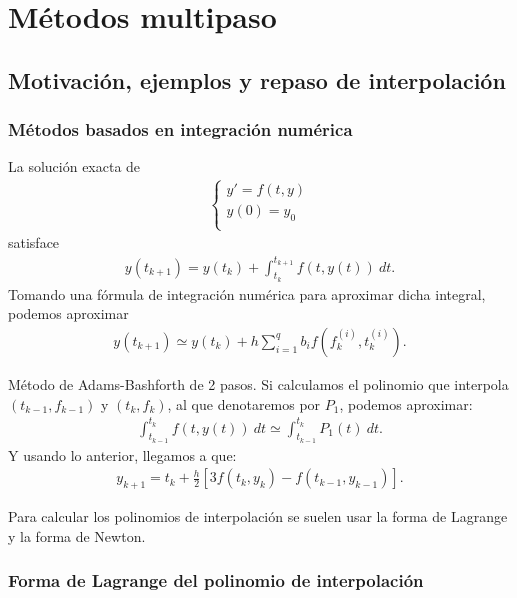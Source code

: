 \chapter{Métodos multipaso}

\section{Motivación, ejemplos y repaso de interpolación}

\subsection{Métodos basados en integración numérica}

La solución exacta de
\begin{align*}
    \left\{ \begin{array}{lcc}
                y' = f(t,y) \\
                y(0) = y_0  \\
            \end{array}
    \right.
\end{align*}
satisface
\begin{align*}
    y(t_{k+1}) = y(t_k) + \int_{t_k}^{t_{k+1}} f(t,y(t)) \ dt.
\end{align*}
Tomando una fórmula de integración numérica para aproximar dicha integral, podemos aproximar
\begin{align*}
    y(t_{k+1}) \simeq y(t_k) +h\sum_{i=1}^{q} b_if\left( f_k^{(i)}, t_k^{(i)} \right).
\end{align*}

\begin{ejemplo}
    Método de Adams-Bashforth de 2 pasos. Si calculamos el polinomio que interpola $(t_{k-1},f_{k-1})$ y $(t_k,f_k)$, al que denotaremos por $P_1$, podemos aproximar:
    \begin{align*}
        \int_{t_{k-1}}^{t_k} f(t,y(t)) \ dt \simeq  \int_{t_{k-1}}^{t_k} P_1(t) \ dt.
    \end{align*}
    Y usando lo anterior, llegamos a que:
    \begin{align*}
        y_{k+1} = t_k + \frac{h}{2}[3f(t_k,y_k) - f(t_{k-1},y_{k-1})].
    \end{align*}
\end{ejemplo}

Para calcular los polinomios de interpolación se suelen usar la forma de Lagrange y la forma de Newton.

\subsection{Forma de Lagrange del polinomio de interpolación}

